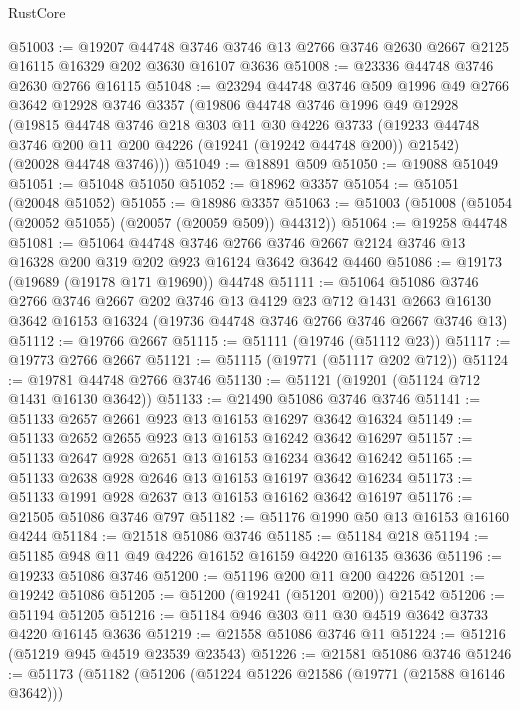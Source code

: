 \begin{lexlean}{RustCore}
\begin{coremodule}
@51003 := @19207
    @44748
    @3746
    @3746
    @13
    @2766
    @3746
    @2630
    @2667
    @2125
    @16115
    @16329
    @202
    @3630
    @16107
    @3636
@51008 := @23336 @44748 @3746 @2630 @2766 @16115
@51048 := @23294
    @44748
    @3746
    @509
    @1996
    @49
    @2766
    @3642
    @12928
    @3746
    @3357
    (@19806
      @44748
      @3746
      @1996
      @49
      @12928
      (@19815
        @44748
        @3746
        @218
        @303
        @11
        @30
        @4226
        @3733
        (@19233 @44748 @3746 @200 @11 @200 @4226 (@19241 (@19242 @44748 @200)) @21542)
        (@20028 @44748 @3746)))
@51049 := @18891 @509
@51050 := @19088 @51049
@51051 := @51048 @51050
@51052 := @18962 @3357
@51054 := @51051 (@20048 @51052)
@51055 := @18986 @3357
@51063 := @51003 (@51008 (@51054 (@20052 @51055) (@20057 (@20059 @509)) @44312))
@51064 := @19258 @44748
@51081 := @51064
    @44748
    @3746
    @2766
    @3746
    @2667
    @2124
    @3746
    @13
    @16328
    @200
    @319
    @202
    @923
    @16124
    @3642
    @3642
    @4460
@51086 := @19173 (@19689 (@19178 @171 @19690)) @44748
@51111 := @51064
    @51086
    @3746
    @2766
    @3746
    @2667
    @202
    @3746
    @13
    @4129
    @23
    @712
    @1431
    @2663
    @16130
    @3642
    @16153
    @16324
    (@19736 @44748 @3746 @2766 @3746 @2667 @3746 @13)
@51112 := @19766 @2667
@51115 := @51111 (@19746 (@51112 @23))
@51117 := @19773 @2766 @2667
@51121 := @51115 (@19771 (@51117 @202 @712))
@51124 := @19781 @44748 @2766 @3746
@51130 := @51121 (@19201 (@51124 @712 @1431 @16130 @3642))
@51133 := @21490 @51086 @3746 @3746
@51141 := @51133 @2657 @2661 @923 @13 @16153 @16297 @3642 @16324
@51149 := @51133 @2652 @2655 @923 @13 @16153 @16242 @3642 @16297
@51157 := @51133 @2647 @928 @2651 @13 @16153 @16234 @3642 @16242
@51165 := @51133 @2638 @928 @2646 @13 @16153 @16197 @3642 @16234
@51173 := @51133 @1991 @928 @2637 @13 @16153 @16162 @3642 @16197
@51176 := @21505 @51086 @3746 @797
@51182 := @51176 @1990 @50 @13 @16153 @16160 @4244
@51184 := @21518 @51086 @3746
@51185 := @51184 @218
@51194 := @51185 @948 @11 @49 @4226 @16152 @16159 @4220 @16135 @3636
@51196 := @19233 @51086 @3746
@51200 := @51196 @200 @11 @200 @4226
@51201 := @19242 @51086
@51205 := @51200 (@19241 (@51201 @200)) @21542
@51206 := @51194 @51205
@51216 := @51184 @946 @303 @11 @30 @4519 @3642 @3733 @4220 @16145 @3636
@51219 := @21558 @51086 @3746 @11
@51224 := @51216 (@51219 @945 @4519 @23539 @23543)
@51226 := @21581 @51086 @3746
@51246 := @51173
    (@51182
      (@51206
        (@51224 @51226 @21586 (@19771 (@21588 @16146 @3642)))

\end{coremodule}
\end{lexlean}
